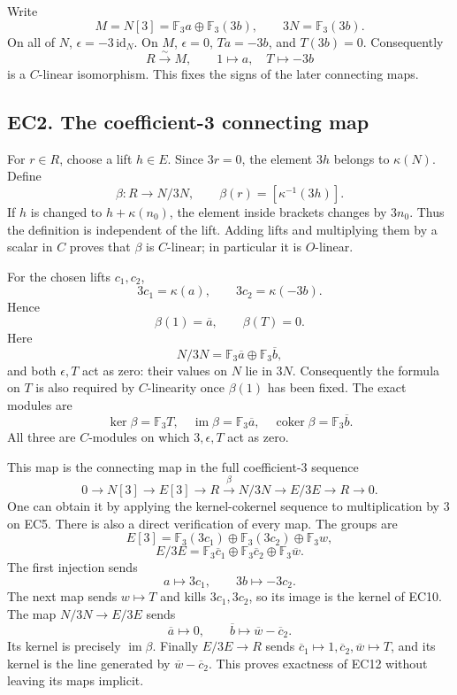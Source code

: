 \documentclass[
  10pt,
  a4paper,
]{article}
\begin{document}
Write \[
M=N[3]=\mathbb F_3a\oplus\mathbb F_3(3b),\qquad
3N=\mathbb F_3(3b).
\tag{EC7}
\] On all of \(N\), \(\epsilon=-3\,\mathrm{id}_N\). On \(M\),
\(\epsilon=0\), \(Ta=-3b\), and \(T(3b)=0\). Consequently \[
R\xrightarrow{\sim}M,\qquad 1\mapsto a,\quad T\mapsto-3b
\tag{EC8}
\] is a \(C\)-linear isomorphism. This fixes the signs of the later
connecting maps.

\subsection{EC2. The coefficient-3 connecting
map}\label{ec2.-the-coefficient-3-connecting-map}

For \(r\in R\), choose a lift \(h\in E\). Since \(3r=0\), the element
\(3h\) belongs to \(\kappa(N)\). Define \[
\beta:R\longrightarrow N/3N,\qquad
\beta(r)=[\kappa^{-1}(3h)].
\tag{EC9}
\] If \(h\) is changed to \(h+\kappa(n_0)\), the element inside brackets
changes by \(3n_0\). Thus the definition is independent of the lift.
Adding lifts and multiplying them by a scalar in \(C\) proves that
\(\beta\) is \(C\)-linear; in particular it is \(O\)-linear.

For the chosen lifts \(c_1,c_2\), \[
3c_1=\kappa(a),\qquad 3c_2=\kappa(-3b).
\] Hence \[
\boxed{\beta(1)=\overline a,\qquad\beta(T)=0.}
\tag{EC10}
\] Here \[
N/3N=\mathbb F_3\overline a\oplus\mathbb F_3\overline b,
\] and both \(\epsilon,T\) act as zero: their values on \(N\) lie in
\(3N\). Consequently the formula on \(T\) is also required by
\(C\)-linearity once \(\beta(1)\) has been fixed. The exact modules are
\[
\ker\beta=\mathbb F_3T,\quad
\operatorname{im}\beta=\mathbb F_3\overline a,\quad
\operatorname{coker}\beta=\mathbb F_3\overline b.
\tag{EC11}
\] All three are \(C\)-modules on which \(3,\epsilon,T\) act as zero.

This map is the connecting map in the full coefficient-3 sequence \[
0\to N[3]\to E[3]\to R
\xrightarrow{\beta}N/3N\to E/3E\to R\to0.
\tag{EC12}
\] One can obtain it by applying the kernel-cokernel sequence to
multiplication by 3 on EC5. There is also a direct verification of every
map. The groups are \[
E[3]=\mathbb F_3(3c_1)\oplus\mathbb F_3(3c_2)\oplus\mathbb F_3w,
\] \[
E/3E=\mathbb F_3\overline c_1\oplus
\mathbb F_3\overline c_2\oplus\mathbb F_3\overline w.
\] The first injection sends \[
a\mapsto3c_1,\qquad3b\mapsto-3c_2.
\] The next map sends \(w\mapsto T\) and kills \(3c_1,3c_2\), so its
image is the kernel of EC10. The map \(N/3N\to E/3E\) sends \[
\overline a\mapsto0,\qquad
\overline b\mapsto\overline w-\overline c_2.
\] Its kernel is precisely \(\operatorname{im}\beta\). Finally
\(E/3E\to R\) sends
\(\overline c_1\mapsto1,\overline c_2,\overline w\mapsto T\), and its
kernel is the line generated by \(\overline w-\overline c_2\). This
proves exactness of EC12 without leaving its maps implicit.
\end{document}
